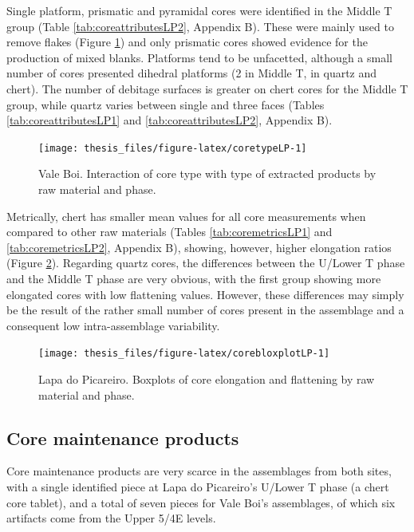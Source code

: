 \documentclass[12pt,twoside]{reedthesis}
\begin{document}
Single platform, prismatic and pyramidal cores were identified in the Middle T group (Table \ref{tab:coreattributesLP2}, Appendix B). These were mainly used to remove flakes (Figure \ref{fig:coretypeLP}) and only prismatic cores showed evidence for the production of mixed blanks. Platforms tend to be unfacetted, although a small number of cores presented dihedral platforms (2 in Middle T, in quartz and chert). The number of debitage surfaces is greater on chert cores for the Middle T group, while quartz varies between single and three faces (Tables \ref{tab:coreattributesLP1} and \ref{tab:coreattributesLP2}, Appendix B).
\begin{figure}[H]

{\centering \texttt{[image: thesis\_files/figure-latex/coretypeLP-1]} 

}

\caption{Vale Boi. Interaction of core type with type of extracted products by raw material and phase.}\label{fig:coretypeLP}
\end{figure}
Metrically, chert has smaller mean values for all core measurements when compared to other raw materials (Tables \ref{tab:coremetricsLP1} and \ref{tab:coremetricsLP2}, Appendix B), showing, however, higher elongation ratios (Figure \ref{fig:corebloxplotLP}). Regarding quartz cores, the differences between the U/Lower T phase and the Middle T phase are very obvious, with the first group showing more elongated cores with low flattening values. However, these differences may simply be the result of the rather small number of cores present in the assemblage and a consequent low intra-assemblage variability.
\begin{figure}[H]

{\centering \texttt{[image: thesis\_files/figure-latex/corebloxplotLP-1]} 

}

\caption{Lapa do Picareiro. Boxplots of core elongation and flattening by raw material and phase.}\label{fig:corebloxplotLP}
\end{figure}
\hypertarget{core-maintenance-products}{%
\subsection{Core maintenance products}\label{core-maintenance-products}}

Core maintenance products are very scarce in the assemblages from both sites, with a single identified piece at Lapa do Picareiro's U/Lower T phase (a chert core tablet), and a total of seven pieces for Vale Boi's assemblages, of which six artifacts come from the Upper 5/4E levels.
\end{document}
